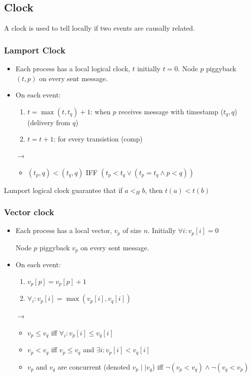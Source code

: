 \subsection{Clock}
A clock is used to tell locally if two events are causally related.

\subsubsection{Lamport Clock}
\begin{itemize}
    \item Each process has a local logical clock, $t$ initially $t=0$.
        Node $p$ piggyback $(t, p)$ on every sent message.
    \item On each event:
    \begin{enumerate}
        \item $t = \max(t, t_q) + 1$: when $p$ receives message with
            timestamp ($t_q, q$) (delivery from $q$)
        \item $t = t+1$: for every transistion (comp)
    \end{enumerate}

    \item[$\to$]
        \begin{itemize}
            \item $(t_p, q) < (t_q, q)$ IFF $(t_p <t_q \vee (t_p = t_q \wedge p <
        q))$
\end{itemize}
\end{itemize}

Lamport logical clock guarantee that if $a <_H b$, then $t(a) < t(b)$

\subsubsection{Vector clock}
\begin{itemize}
    \item Each process has a local vector, $v_p$ of size $n$. Initially
        $\forall i : v_p[i]=0$

        Node $p$ piggyback $v_p$ on every sent message.
    \item On each event:
    \begin{enumerate}
        \item $v_p[p] = v_p[p] + 1$
        \item $\forall_i : v_p[i] = \max(v_p[i], v_q[i])$
    \end{enumerate}

\item[$\to$] \begin{itemize}
        \item $v_p \leq v_q$ iff $\forall_i : v_p[i] \leq v_q[i]$
        \item $v_p < v_q$ iff $v_p \leq v_q$ and $\exists i : v_p[i] <
            v_q[i]$
        \item $v_p$ and $v_q$ are concurrent (denoted $v_p \mid\mid v_q$) iff
        $\lnot(v_p < v_q) \land \lnot(v_q < v_p)$
    \end{itemize}
\end{itemize}

